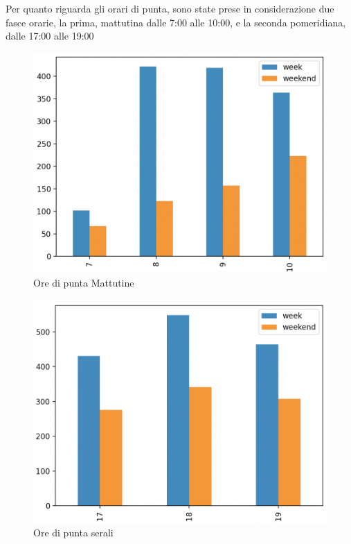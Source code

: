 \documentclass[a4paper]{report}
\begin{document}
Per quanto riguarda gli orari di punta, 
sono state prese in considerazione due fasce orarie, la prima, 
mattutina dalle 7:00 alle 10:00, e la seconda pomeridiana, 
dalle 17:00 alle 19:00

\begin{figure}
\includegraphics[width=\linewidth]{../src/incidenti/incidenti_senza_coords/ore_punta/ore_punta_mattina.png}
\caption{Ore di punta Mattutine}
\label{fig:punta_mattina}
\end{figure}

\begin{figure}
    \includegraphics[width=\linewidth]{../src/incidenti/incidenti_senza_coords/ore_punta/ore_punta_sera.png}
    \caption{Ore di punta serali}
    \label{fig:punta_sera}
\end{figure}
\end{document}
